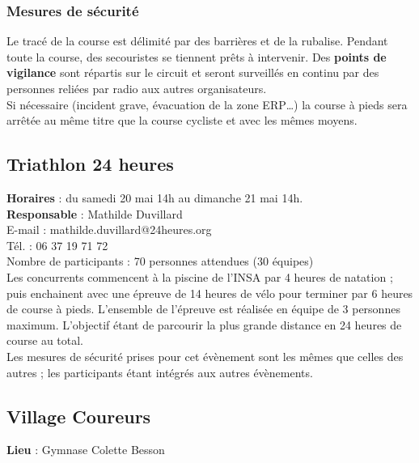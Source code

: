 \documentclass[hidelinks, paper=a4, fontsize=13pt]{report}
\begin{document}
\subsubsection{Mesures de sécurité}



Le tracé de la course est délimité par des barrières et de la rubalise. Pendant toute la course, des secouristes se tiennent prêts à intervenir. 
Des \textbf{points de vigilance} sont répartis sur le circuit et seront surveillés en continu par des personnes reliées par radio aux autres organisateurs.\\

Si nécessaire (incident grave, évacuation de la zone ERP…) la course à pieds sera arrêtée au même titre que la course cycliste et avec les mêmes moyens. 

\subsection{Triathlon 24 heures}

\textbf{Horaires} : du samedi 20 mai 14h au dimanche 21 mai 14h.\\

\textbf{Responsable} : Mathilde Duvillard\\
	E-mail : mathilde.duvillard@24heures.org\\
	Tél. : 06 37 19 71 72\\

Nombre de participants : 70 personnes attendues (30 équipes)\\

Les concurrents commencent à la piscine de l’INSA par 4 heures de natation ; puis enchainent avec une épreuve de 14 heures de vélo pour terminer par 6 heures de course à pieds. L'ensemble de l'épreuve est réalisée en équipe de 3 personnes maximum. L’objectif étant de parcourir la plus grande distance en 24 heures de course au total.\\

Les mesures de sécurité prises pour cet évènement sont les mêmes que celles des autres ; les participants étant intégrés aux autres évènements.\\

\subsection{Village Coureurs}

\textbf{Lieu} : Gymnase Colette Besson\\
\end{document}
